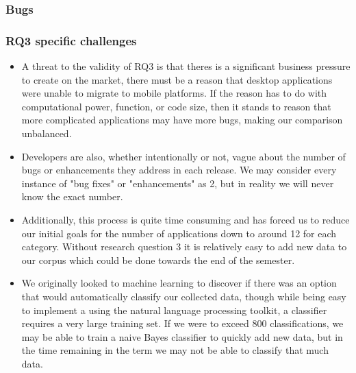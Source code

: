 \documentclass{acm_proc_article-sp}
\begin{document}
\subsubsection{Bugs}


\begin{center}

\label{tab:bugs}
\end{center}

\begin{center}

\label{tab:sumBugs}
\end{center}

\subsubsection{RQ3 specific challenges}
\begin{itemize}


\item A threat to the validity of RQ3 is that theres is a significant business pressure to create \sibs on the market, there must be a reason that desktop applications were unable to migrate to mobile platforms. 
If the reason has to do with computational power, function, or code size, then it stands to reason that more complicated applications may have more bugs, making our comparison unbalanced.

\item Developers are also, whether intentionally or not, vague about the number of bugs or enhancements they address in each release. 
We may consider every instance of "bug fixes" or "enhancements" as 2, but in reality we will never know the exact number.

\item Additionally, this process is quite time consuming and has forced us to reduce our initial goals for the number of applications down to around 12 for each category.
Without research question 3 it is relatively easy to add new data to our corpus which could be done towards the end of the semester.

\item We originally looked to machine learning to discover if there was an option that would automatically classify our collected data, though while being easy to implement a using the natural language processing toolkit, a classifier requires a very large training set.
If we were to exceed 800 classifications, we may be able to train a naive Bayes classifier to quickly add new data, but in the time remaining in the term we may not be able to classify that much data.

\end{itemize}
\end{document}
